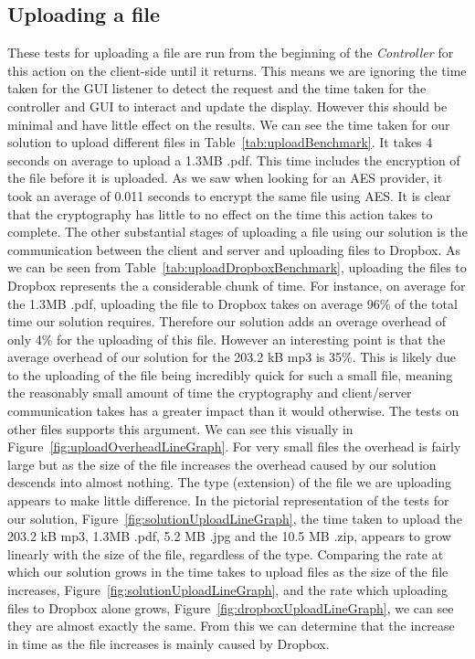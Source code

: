\documentclass[12pt, titlepage]{article}
\begin{document}
\subsection{Uploading a file}
These tests for uploading a file are run from the beginning of the \textit{Controller} for this action on the client-side until it returns. This means we are ignoring the time taken for the GUI listener to detect the request and the time taken for the controller and GUI to interact and update the display. However this should be minimal and have little effect on the results.
\newline \indent We can see the time taken for our solution to upload different files in Table~\ref{tab:uploadBenchmark}. It takes 4 seconds on average to upload a 1.3MB .pdf. This time includes the encryption of the file before it is uploaded. As we saw when looking for an AES provider, it took an average of 0.011 seconds to encrypt the same file using AES. It is clear that the cryptography has little to no effect on the time this action takes to complete. The other substantial stages of uploading a file using our solution is the communication between the client and server and uploading files to Dropbox.
\newline \indent As we can be seen from Table~\ref{tab:uploadDropboxBenchmark}, uploading the files to Dropbox represents the a considerable chunk of time. For instance, on average for the 1.3MB .pdf, uploading the file to Dropbox takes on average 96\% of the total time our solution requires. Therefore our solution adds an overage overhead of only 4\% for the uploading of this file. However an interesting point is that the average overhead of our solution for the 203.2 kB mp3 is 35\%. This is likely due to the uploading of the file being incredibly quick for such a small file, meaning the reasonably small amount of time the cryptography and client/server communication takes has a greater impact than it would otherwise. The tests on other files supports this argument. We can see this visually in Figure~\ref{fig:uploadOverheadLineGraph}. For very small files the overhead is fairly large but as the size of the file increases the overhead caused by our solution descends into almost nothing.
\newline \indent The type (extension) of the file we are uploading appears to make little difference. In the pictorial representation of the tests for our solution, Figure~\ref{fig:solutionUploadLineGraph}, the time taken to upload the 203.2 kB mp3, 1.3MB .pdf, 5.2 MB .jpg and the 10.5 MB .zip, appears to grow linearly with the size of the file, regardless of the type. Comparing the rate at which our solution grows in the time takes to upload files as the size of the file increases, Figure~\ref{fig:solutionUploadLineGraph}, and the rate which uploading files to Dropbox alone grows, Figure~\ref{fig:dropboxUploadLineGraph}, we can see they are almost exactly the same. From this we can determine that the increase in time as the file increases is mainly caused by Dropbox.
\end{document}
